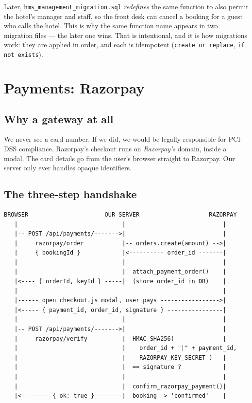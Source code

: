 \documentclass[11pt,a4paper]{article}
\newcommand{\file}[1]{\texttt{\small #1}}
\begin{document}
Later, \file{hms\_management\_migration.sql} \emph{redefines} the same function to
also permit the hotel's manager and staff, so the front desk can cancel a booking
for a guest who calls the hotel. This is why the same function name appears in two
migration files --- the later one wins. That is intentional, and it is how
migrations work: they are applied in order, and each is idempotent
(\texttt{create or replace}, \texttt{if not exists}).

\newpage
\section{Payments: Razorpay}

\subsection{Why a gateway at all}

We never see a card number. If we did, we would be legally responsible for PCI-DSS
compliance. Razorpay's checkout runs on \emph{Razorpay's} domain, inside a modal.
The card details go from the user's browser straight to Razorpay. Our server only
ever handles opaque identifiers.

\subsection{The three-step handshake}

\begin{lstlisting}
BROWSER                      OUR SERVER                    RAZORPAY
   |                              |                            |
   |-- POST /api/payments/------->|                            |
   |     razorpay/order           |-- orders.create(amount) -->|
   |     { bookingId }            |<---------- order_id -------|
   |                              |                            |
   |                              |  attach_payment_order()    |
   |<---- { orderId, keyId } -----|  (store order_id in DB)    |
   |                                                           |
   |------ open checkout.js modal, user pays ----------------->|
   |<----- { payment_id, order_id, signature } ----------------|
   |                              |                            |
   |-- POST /api/payments/------->|                            |
   |     razorpay/verify          |  HMAC_SHA256(              |
   |                              |    order_id + "|" + payment_id,
   |                              |    RAZORPAY_KEY_SECRET )   |
   |                              |  == signature ?            |
   |                              |                            |
   |                              |  confirm_razorpay_payment()|
   |<-------- { ok: true } -------|  booking -> 'confirmed'    |
\end{lstlisting}
\end{document}
